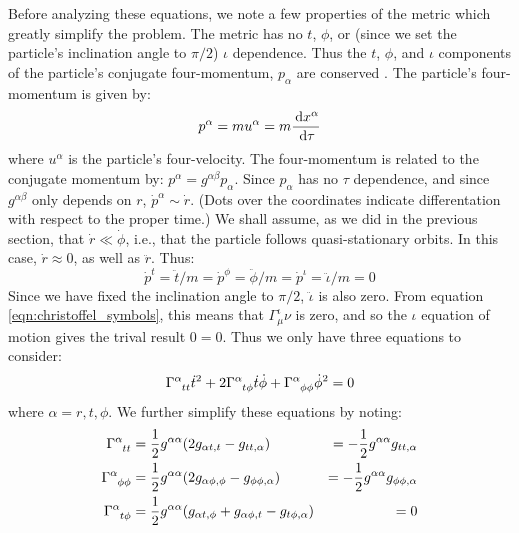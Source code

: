 Before analyzing these equations, we note a few properties of the metric which greatly simplify the problem. The metric has no $t$, $\phi$, or (since we set the particle's inclination angle to $\pi/2$) $\iota$ dependence. Thus the $t$, $\phi$, and $\iota$ components of the particle's conjugate four-momentum, $p_\alpha$ are conserved \cite{ref:MTW, ref:Schutz, ref:Carroll}. The particle's four-momentum is given by:
\begin{equation}
p^{\alpha} = m u^{\alpha} = m \frac{\,\mathrm{d} x^\alpha}{\,\mathrm{d}\tau}
\end{equation}
where $u^{\alpha}$ is the particle's four-velocity. The four-momentum is related to the conjugate momentum by: $p^{\alpha} = g^{\alpha\beta}p_{\alpha}$. Since $p_{\alpha}$ has no $\tau$ dependence, and since $g^{\alpha\beta}$ only depends on $r$, $\dot{p}^{\alpha} \sim \dot{r}$. (Dots over the coordinates indicate differentation with respect to the proper time.) We shall assume, as we did in the previous section, that $\dot{r} \ll \dot{\phi}$, i.e., that the particle follows quasi-stationary orbits. In this case, $\dot{r} \approx 0$, as well as $\ddot{r}$. Thus: 
\begin{equation}
\dot{p}^t = \ddot{t}/m = \dot{p}^\phi = \ddot{\phi}/m = \dot{p}^\iota = \ddot{\iota}/m = 0
\end{equation}
Since we have fixed the inclination angle to $\pi/2$, $\ddot{\iota}$ is also zero. From equation \ref{eqn:christoffel_symbols}, this means that $\Gamma^{\iota}_\mu\nu$ is zero, and so the $\iota$ equation of motion gives the trival result $0 = 0$. Thus we only have three equations to consider:
\begin{equation}
\label{eqn:equations_of_motion}
\Gamma\indices{^\alpha_{tt}} \dot{t}^2 + 2\Gamma\indices{^\alpha_{t\phi}}\dot{t}\dot{\phi} + \Gamma\indices{^\alpha_{\phi\phi}} \dot{\phi}^2 = 0 
\end{equation}
where $\alpha = r,t,\phi$. We further simplify these equations by noting:
\begin{align*}
\Gamma\indices{^\alpha_{tt}} &= \frac{1}{2} g^{\alpha\alpha}(2g_{\alpha t,t} - g_{tt,\alpha}) &= -\frac{1}{2} g^{\alpha\alpha}g_{tt,\alpha} \\
\Gamma\indices{^\alpha_{\phi\phi}} &= \frac{1}{2} g^{\alpha\alpha}(2g_{\alpha \phi,\phi} - g_{\phi\phi,\alpha}) &= -\frac{1}{2} g^{\alpha\alpha}g_{\phi\phi,\alpha} \\
\Gamma\indices{^\alpha_{t\phi}} &= \frac{1}{2} g^{\alpha\alpha}(g_{\alpha t,\phi} + g_{\alpha \phi,t} - g_{t\phi,\alpha}) &= 0 \\
\end{align*}
